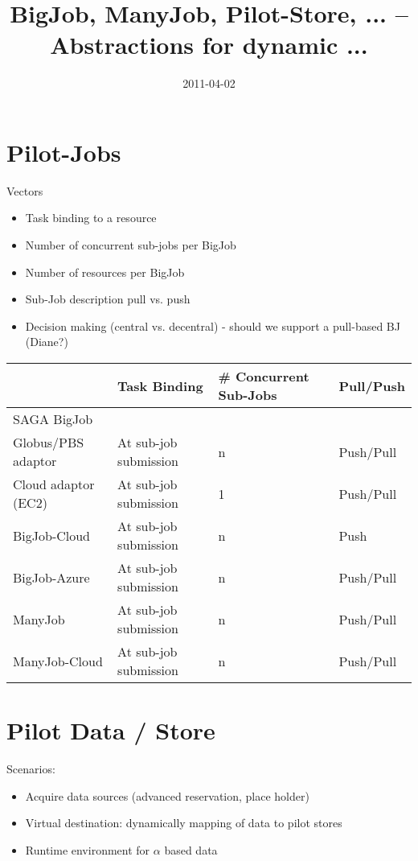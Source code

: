 \documentclass[]{article}
\title{BigJob, ManyJob, Pilot-Store, ... -- Abstractions for dynamic ...}
\author{  }
\date{2011-04-02}
\begin{document}
\ifpdf
{}
\else
{}
\fi

\maketitle


\section{Pilot-Jobs}

Vectors
\begin{itemize}
	\item Task binding to a resource
	\item Number of concurrent sub-jobs per BigJob
	\item Number of resources per BigJob
	\item Sub-Job description pull vs. push
	\item Decision making (central vs. decentral) - should we support a pull-based BJ (Diane?)
\end{itemize}

\begin{tabular}{|l|p{2.5cm}|p{2.5cm}|p{2.5cm}|}
	\hline
	&Task Binding &\# Concurrent Sub-Jobs &Pull/Push\\
	\hline
	SAGA BigJob & &&\\
	\hline
	\hspace{4mm} Globus/PBS adaptor  &At sub-job submission  &n &Push/Pull\\ 
	\hline
	\hspace{4mm} Cloud adaptor (EC2) &At sub-job submission  &1 &Push/Pull\\
	\hline
 	BigJob-Cloud &At sub-job submission &n &Push\\
	\hline
	BigJob-Azure &At sub-job submission &n &Push/Pull\\ 
	\hline
	ManyJob &At sub-job submission &n &Push/Pull\\
	\hline
 	ManyJob-Cloud &At sub-job submission &n &Push/Pull\\
	\hline 
\end{tabular}

\section{Pilot Data / Store}
\noindent
Scenarios:
\begin{itemize}
	\item Acquire data sources (advanced reservation, place holder)
	\item Virtual destination: dynamically mapping of data to pilot stores
	\item Runtime environment for $\alpha$ based data
\end{itemize}
	
\end{document}
